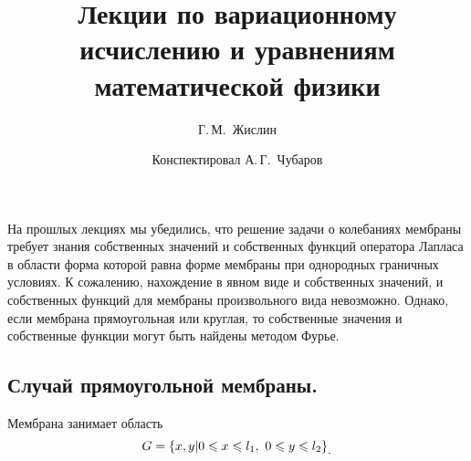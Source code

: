 \documentclass[12pt,a4paper,openany,fleqn]{book}
\newcommand{\mc}[1]{\ensuremath{\mathcal{#1}}}
\theoremstyle{definition}
\begin{document}
	\author{Г.\,М.~Жислин}
	\title{Лекции по вариационному исчислению и уравнениям математической физики}
	\date{Конспектировал А.\,Г.~Чубаров}
	
	
	
	\maketitle
	
	
	\renewcommand{\thepart}{\Asbuk{part}}
	\renewcommand{\thechapter}{\arabic{chapter}}
	\renewcommand{\thesection}{\arabic{section}}
	\renewcommand{\thesubsection}{\Roman{subsection}}
	\renewcommand{\thefootnote}{\roman{footnote}}
	\renewcommand{\phi}{\varphi}
	\renewcommand{\Re}{\ensuremath{\mc{R}e\,}}
	\renewcommand{\Im}{\ensuremath{\mc{I}m\,}}
	
	\setcounter{chapter}{15}
	\chapter{}
	\label{lecture16}
	На прошлых лекциях мы убедились, что решение задачи о колебаниях мембраны требует знания собственных значений и собственных функций оператора Лапласа в области форма которой равна форме мембраны при однородных граничных условиях. К сожалению, нахождение в явном виде и собственных значений, и собственных функций для мембраны произвольного вида невозможно. Однако, если мембрана прямоугольная или круглая, то собственные значения и собственные функции могут быть найдены методом Фурье.
	\section{Случай прямоугольной мембраны.}
	\label{lecture16section1}
	Мембрана занимает область
	\begin{equation*}
		\hfill G=\left\{x,y|0\leqslant x\leqslant l_1,\ 0\leqslant y\leqslant l_2\right\}_{\displaystyle.}\hfill
	\end{equation*}
	
	
	
	
	
\end{document}
